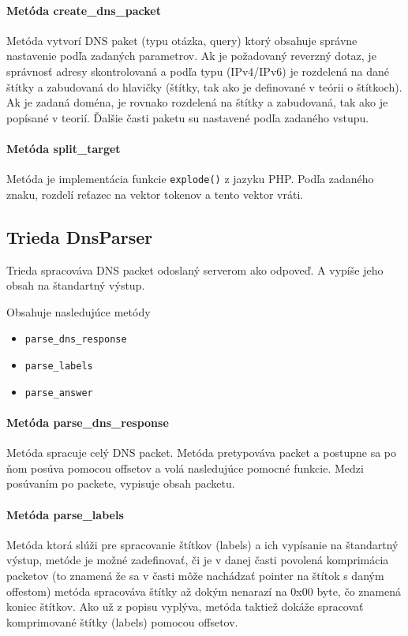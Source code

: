 \documentclass[titlepage]{article}
\begin{document}
\paragraph{Metóda create\_dns\_packet}
Metóda vytvorí DNS paket (typu otázka, query) ktorý obsahuje správne nastavenie podľa zadaných parametrov.
Ak je požadovaný reverzný dotaz, je správnosť adresy skontrolovaná a podľa typu (IPv4/IPv6) je rozdelená na dané
štítky a zabudovaná do hlavičky (štítky, tak ako je definované v teórii o štítkoch). Ak je zadaná doména, je rovnako
rozdelená na štítky a zabudovaná, tak ako je popísané v teorií. Ďalšie časti paketu su nastavené podľa zadaného vstupu.

\paragraph{Metóda split\_target}
Metóda je implementácia funkcie \verb|explode()| z jazyku PHP. Podľa zadaného znaku, rozdelí reťazec na vektor
tokenov a tento vektor vráti.

\subsection{Trieda DnsParser}
Trieda spracováva DNS packet odoslaný serverom ako odpoveď. A vypíše jeho obsah na štandartný výstup.

Obsahuje nasledujúce metódy
\begin{itemize}
   \item \verb|parse_dns_response|
   \item \verb|parse_labels|
   \item \verb|parse_answer| 
\end{itemize}

\paragraph{Metóda parse\_dns\_response}
Metóda spracuje celý DNS packet.
Metóda pretypováva packet a postupne sa po ňom posúva pomocou offsetov a volá nasledujúce pomocné funkcie.
Medzi posúvaním po packete, vypisuje obsah packetu.

\paragraph{Metóda parse\_labels}
Metóda ktorá slúži pre spracovanie štítkov (labels) a ich vypísanie na štandartný výstup, metóde je možné
zadefinovať, či je v danej časti povolená komprimácia packetov (to znamená že sa v časti môže nachádzať pointer na 
štítok s daným offestom) metóda spracováva štítky až dokým nenarazí na 0x00 byte, čo znamená koniec štítkov. Ako už z popisu 
vyplýva, metóda taktiež dokáže spracovať komprimované štítky (labels) pomocou offsetov.
\end{document}
